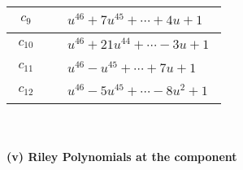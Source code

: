 \documentclass[1p]{elsarticle_modified}
\theoremstyle{definition}
\begin{document}
\begin{tabular}{m{50pt}|m{274pt}}
\hline $$\begin{aligned}c_{9}\end{aligned}$$&$\begin{aligned}
&u^{46}+7 u^{45}+\cdots+4 u+1
\end{aligned}$\\
\hline $$\begin{aligned}c_{10}\end{aligned}$$&$\begin{aligned}
&u^{46}+21 u^{44}+\cdots-3 u+1
\end{aligned}$\\
\hline $$\begin{aligned}c_{11}\end{aligned}$$&$\begin{aligned}
&u^{46}- u^{45}+\cdots+7 u+1
\end{aligned}$\\
\hline $$\begin{aligned}c_{12}\end{aligned}$$&$\begin{aligned}
&u^{46}-5 u^{45}+\cdots-8 u^2+1
\end{aligned}$\\
\hline
\end{tabular}\\~\\
\newpage\renewcommand{\arraystretch}{1}
\flushleft \textbf{(v) Riley Polynomials at the component}\newline \\
\end{document}
